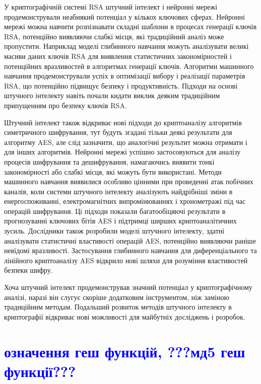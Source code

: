 У криптографічній системі RSA штучний інтелект і нейронні мережі продемонстрували неабиякий потенціал у кількох ключових сферах. Нейронні мережі можна навчити розпізнавати складні шаблони в процесах генерації ключів RSA, потенційно виявляючи слабкі місця, які традиційний аналіз може пропустити. Наприклад моделі глибинного навчання можуть аналізувати великі масиви даних ключів RSA для виявлення статистичних закономірностей і потенційних вразливостей в алгоритмах генерації ключів. Алгоритми машинного навчання продемонстрували успіх в оптимізації вибору і реалізації параметрів RSA, що потенційно підвищує безпеку і продуктивність. Підходи на основі штучного інтелекту навіть почали кидати виклик деяким традиційним припущенням про безпеку ключів RSA.

Штучний інтелект також відкриває нові підходи до криптоаналізу алгоритмів симетричного шифрування, тут будуть згадані тільки деякі результати для алгоритму AES, але слід зазначити, що аналогічні результит можна отримати і для інших алгоритмів. Нейронні мережі успішно застосовуються для аналізу процесів шифрування та дешифрування, намагаючись виявити тонкі закономірності або слабкі місця, які можуть бути використані. Методи машинного навчання виявилися особливо цінними при проведенні атак побічних каналів, коли системи штучного інтелекту аналізують найдрібніші зміни в енергоспоживанні, електромагнітних випромінюваннях і хронометражі під час операцій шифрування. Ці підходи показали багатообіцяючі результати в прогнозуванні ключових бітів AES і підтримці ширших криптоаналітичних зусиль. Дослідники також розробили моделі штучного інтелекту, здатні аналізувати статистичні властивості операцій AES, потенційно виявляючи раніше невідомі вразливості. Застосування глибинного навчання для диференціального та лінійного криптоаналізу AES відкрило нові шляхи для розуміння властивостей безпеки шифру.

Хоча штучний інтелект продемонстрував значний потенціал у криптографічному аналізі, наразі він слугує скоріше додатковим інструментом, ніж заміною традиційним методам. Подальший розвиток методів штучного інтелекту в криптографії відкриває нові можливості для майбутніх досліджень і розробок.

\section{\textcolor{blue}{означення геш функцій, ???мд5 геш функції???}}

